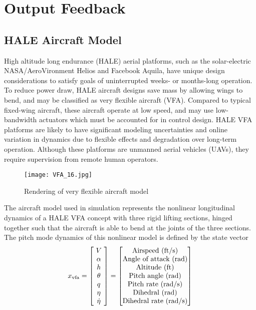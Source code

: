 \section{Output Feedback}

\subsection{HALE Aircraft Model}\label{subsec:vfa_model}
High altitude long endurance (HALE) aerial platforms, such as the solar-electric NASA/AeroVironment Helios and Facebook Aquila, have unique design considerations to satisfy goals of uninterrupted weeks- or months-long operation. To reduce power draw, HALE aircraft designs save mass by allowing wings to bend, and may be classified as very flexible aircraft (VFA). Compared to typical fixed-wing aircraft, these aircraft operate at low speed, and may use low-bandwidth actuators which must be accounted for in control design. HALE VFA platforms are likely to have significant modeling uncertainties and online variation in dynamics due to flexible effects and degradation over long-term operation. Although these platforms are unmanned aerial vehicles (UAVs), they require supervision from remote human operators.

\begin{figure}[htbp]
	\centering
	\texttt{[image: VFA\_16.jpg]}
	\caption{Rendering of very flexible aircraft model}
	\label{fig:vfa}
\end{figure}

The aircraft model used in simulation represents the nonlinear longitudinal dynamics of a HALE VFA concept with three rigid lifting sections, hinged together such that the aircraft is able to bend at the joints of the three sections. The pitch mode dynamics of this nonlinear model is defined by the state vector
\begin{equation}
x_{\text{vfa}} = \begin{bmatrix}
~V~\\
\alpha \\
h \\
\theta \\
q\\
\eta\\
\dot{\eta}
\end{bmatrix} =
\begin{bmatrix}
	 $Airspeed (ft/s)$\\ $Angle of attack (rad)$\\ $Altitude (ft)$\\ $Pitch angle (rad)$\\ $Pitch rate (rad/s)$\\ $Dihedral (rad)$\\ $Dihedral rate (rad/s)$
\end{bmatrix}
\end{equation}

